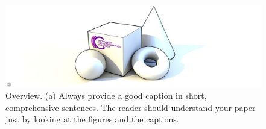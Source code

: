 
\begin{figure}[t]
    \centering
    \includegraphics[width=\textwidth]{figures/figure_template.png}
    \caption{Overview. (a) Always provide a good caption in short, comprehensive sentences. The reader should understand your paper just by looking at the figures and the captions.}
\label{fig:overview}
\end{figure}

